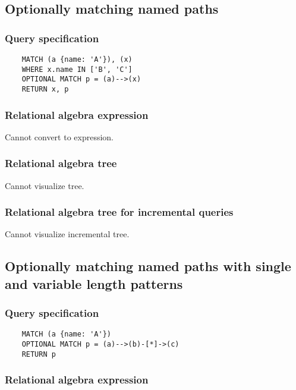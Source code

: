 	\subsection{Optionally matching named paths}

	\subsubsection*{Query specification}

	\begin{lstlisting}
	MATCH (a {name: 'A'}), (x)
	WHERE x.name IN ['B', 'C']
	OPTIONAL MATCH p = (a)-->(x)
	RETURN x, p
	\end{lstlisting}


	\subsubsection*{Relational algebra expression}

	Cannot convert to expression.

	\subsubsection*{Relational algebra tree}

	Cannot visualize tree.

	\subsubsection*{Relational algebra tree for incremental queries}

	Cannot visualize incremental tree.
	\subsection{Optionally matching named paths with single and variable length patterns}

	\subsubsection*{Query specification}

	\begin{lstlisting}
	MATCH (a {name: 'A'})
	OPTIONAL MATCH p = (a)-->(b)-[*]->(c)
	RETURN p
	\end{lstlisting}


	\subsubsection*{Relational algebra expression}

